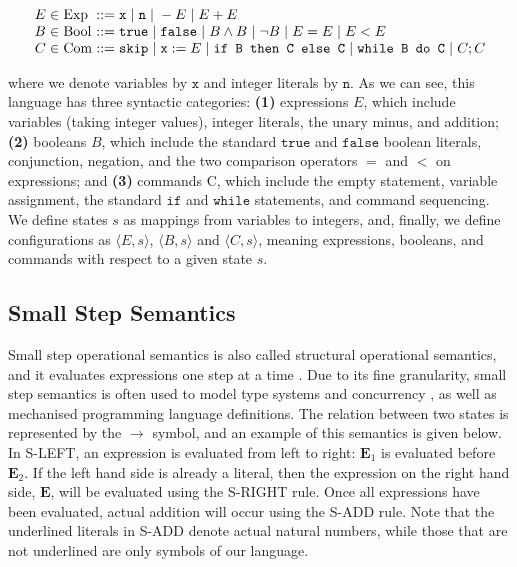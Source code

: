 \documentclass[a4paper,11pt,twoside]{report}
\begin{document}
$$
\arraycolsep=1.5pt
\begin{array}{rclcl}
E & \in & \mathrm{Exp} & ::= & \texttt{x} \myor \texttt{n} \myor - E \myor E + E \\
B & \in & \mathrm{Bool} & ::= & \texttt{true} \myor \texttt{false} \myor B \land B \myor \neg B \myor E = E \myor E < E \\
C & \in & \mathrm{Com} & ::= & \texttt{skip} \myor \texttt{x}:=E \myor \texttt{if B then C else C} \myor \texttt{while B do C} \myor C; C 
\end{array}
$$

\noindent where we denote variables by $\texttt{x}$ and integer literals by $\texttt{n}$. As we can see, this language has three syntactic categories: {\bfseries(1)} expressions $E$, which include variables (taking integer values), integer literals, the unary minus, and addition; {\bfseries(2)} booleans $B$, which include the standard $\mathtt{true}$ and $\mathtt{false}$ boolean literals, conjunction, negation, and the two comparison operators $=$ and $<$ on expressions; and {\bfseries(3)} commands {C}, which include the empty statement, variable assignment, the standard $\mathtt{if}$ and $\mathtt{while}$ statements, and command sequencing. We define states $s$ as mappings from variables to integers, and, finally, we define configurations as $\langle E,s \rangle$, $\langle B,s\rangle$ and $\langle C,s \rangle$, meaning expressions, booleans, and commands with respect to a given state $s$.

\subsection{Small Step Semantics}
Small step operational semantics is also called structural operational semantics, and it evaluates expressions one step at a time \cite{Lecture2}. Due to its fine granularity, small step semantics is often used to model type systems and concurrency \cite{chargueraud-13-pretty}, as well as mechanised programming language definitions. The relation between two states is represented by the $\rightarrow$ symbol, and an example of this semantics is given below. In S-LEFT, an expression is evaluated from left to right: $\mathbf{E}_1$ is evaluated before $\mathbf{E}_2$. If the left hand side is already a literal, then the expression on the right hand side, $\mathbf{E}$, will be evaluated using the S-RIGHT rule. Once all expressions have been evaluated, actual addition will occur using the S-ADD rule. Note that the underlined literals in S-ADD denote  actual natural numbers, while those that are not underlined are only symbols of our language.
\end{document}
